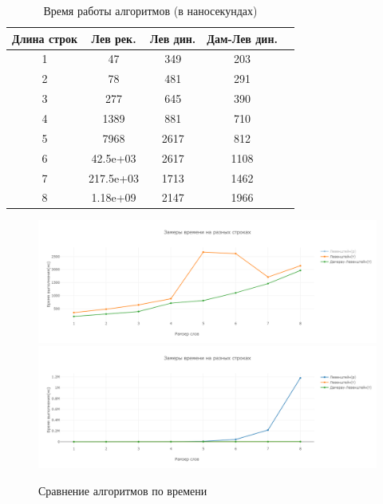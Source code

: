 \begin{table}[h]
	\begin{center}
		\begin{threeparttable}
		\captionsetup{justification=raggedright,singlelinecheck=off}
		\caption{Время работы алгоритмов (в наносекундах)}
		\label{tbl:time_measurements}
		\begin{tabular}{|c|c|c|c|c|}
			\hline
			Длина строк &  Лев рек. & Лев дин. & Дам-Лев дин. \\
			\hline
			1    & 47 & 349 & 203 \\ 
			\hline
			2    & 78 & 481 & 291 \\ 
			\hline
			3    & 277 & 645 & 390 \\ 
			\hline
			4    & 1389 & 881 & 710 \\ 
			\hline
			5    & 7968 & 2617 & 812 \\ 
			\hline
			6    & 42.5e+03 & 2617 & 1108 \\ 
			\hline
			7    & 217.5e+03 & 1713 & 1462 \\ 
			\hline
			8    & 1.18e+09 & 2147 & 1966 \\ 
			\hline
		\end{tabular}
		\end{threeparttable}
    \end{center}
\end{table}

\begin{figure}[h]
    \centering
    \includegraphics[width=0.8\linewidth]{images/plots_1.png}
    \vspace{5mm}
    \includegraphics[width=0.8\linewidth]{images/plots_2.png}
    \caption{Сравнение алгоритмов по времени}
    \label{fig:time_measurements}
\end{figure}


